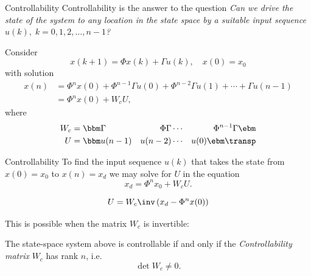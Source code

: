 \documentclass[presentation,aspectratio=1610]{beamer}
\begin{document}
\begin{frame}[label={sec:orgf8a8662}]{Controllability}
Controllability is the answer to the question \emph{Can we drive the state of the system to any location in the state space by a suitable input sequence \(u(k),\; k=0,1,2,\ldots,n-1\)?}

Consider
\[ x(k+1) = \Phi x(k) + \Gamma u(k), \quad x(0)= x_0 \]
with solution
\begin{equation}
\begin{split}
x(n) &= \Phi^nx(0) + \Phi^{n-1}\Gamma u(0) + \Phi^{n-2}\Gamma u(1) + \cdots + \Gamma u(n-1)\\
     &= \Phi^nx(0) + W_c U, 
\end{split}
\end{equation}
where
\begin{align*}
W_c &= \bbm \Gamma & \Phi\Gamma & \cdots & \Phi^{n-1}\Gamma\ebm\\
U &= \bbm u(n-1) & u(n-2) & \cdots & u(0) \ebm\transp
\end{align*}
\end{frame}

\begin{frame}[label={sec:org020d0e3}]{Controllability}
To find the input sequence \(u(k)\) that takes the state from  \(x(0)=x_0\) to \(x(n) = x_d\) we may solve for \(U\) in the equation
\[ x_d = \Phi^nx_0 + W_cU.\]

\[ U = W_c\inv \left(x_d - \Phi^nx(0)\right) \]

This is possible when the matrix \(W_c\) is \alert{invertible}:

The state-space system above is controllable if and only if the \emph{Controllability matrix} \(W_c\)  has rank \(n\), i.e. 
\[ \det W_c \neq 0.\]
\end{frame}
\end{document}

